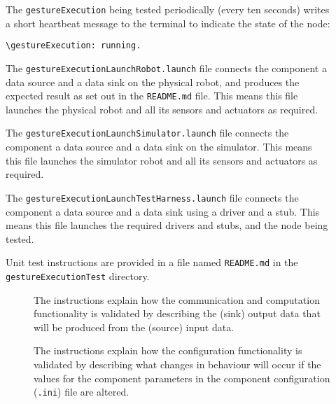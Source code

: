 \documentclass{CSSRforAfrica}
\newcommand{\checkboxChecked}{\fbox{\ding{51}}} %
\newcommand{\checkboxDashed}{\fbox{--}}         %
\begin{document}
\begin{description}
\item[\checkboxChecked]  The {\small \verb+gestureExecution+} being tested periodically (every ten seconds) writes a short heartbeat message to
 the terminal to indicate the state of the node:
\begin{verbatim}
\gestureExecution: running.
\end{verbatim}

\item[\checkboxChecked] The {\small \verb+gestureExecutionLaunchRobot.launch+} file  connects the component a data source and a data sink on the physical robot, and produces the expected result as set out in the  {\small \verb+README.md+}  file.    This means this file launches the physical robot and all its sensors and actuators as required.

\item[\checkboxDashed] The {\small \verb+gestureExecutionLaunchSimulator.launch+} file  connects the component a data source and a data sink on the simulator.   This means this file launches the simulator robot and all its sensors and actuators as required.

\item[\checkboxChecked] The {\small \verb+gestureExecutionLaunchTestHarness.launch+} file  connects the component a data source and a data sink using a driver and a stub.   This means this file launches the required drivers and stubs, and the node being tested.

\item[\checkboxChecked] Unit test instructions are provided in a file named {\small \verb+README.md+} in the  {\small \verb+gestureExecutionTest+} directory. 


\begin{description}

\item[\checkboxChecked] The instructions explain how the communication and computation functionality is validated by describing the (sink) output data that will be produced from the (source) input data.  

\item[\checkboxChecked] The instructions explain how the configuration functionality is validated by describing what changes in behaviour will occur if the values for the component parameters in the component configuration ({\small \verb+.ini+}) file are altered.

\end{description}

\end{description} 
\end{document}
